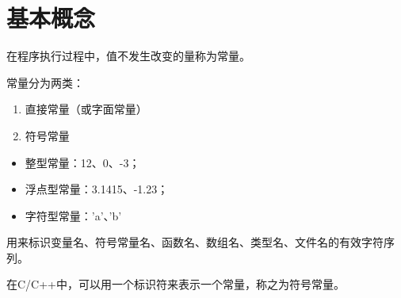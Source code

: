 \section{基本概念}

%

\begin{frame}
\begin{defn}[\blue{常量}]{}
在程序执行过程中，值不发生改变的量称为常量。
\end{defn} \vspace{0.1in}

常量分为两类：\vspace{0.05in}

\begin{enumerate}
\item 直接常量（或字面常量）\\[0.1in]
\item 符号常量
\end{enumerate}
\end{frame}

\begin{frame}

\begin{itemize}
\item 整型常量：12、0、-3；\\[0.1in]
\item 浮点型常量：3.1415、-1.23；\\[0.1in]
\item 字符型常量：'a'、'b'
\end{itemize}
\end{frame}

\begin{frame}[fragile]

\begin{defn}{}
用来标识变量名、符号常量名、函数名、数组名、类型名、文件名的有效字符序列。
\end{defn} \pause \vspace{0.1in}

\begin{defn}{}
在C/C++中，可以用一个标识符来表示一个常量，称之为符号常量。
\end{defn} 
\end{frame}

